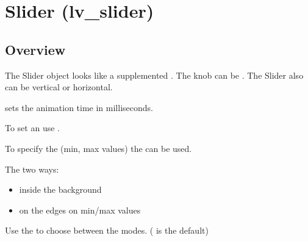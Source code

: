 \documentclass[letterpaper,10pt,english]{sphinxmanual}
\begin{document}
\section{Slider (lv\_slider)}
\label{\detokenize{object-types/slider:slider-lv-slider}}\label{\detokenize{object-types/slider::doc}}

\subsection{Overview}
\label{\detokenize{object-types/slider:overview}}
The Slider object looks like a {\hyperref[\detokenize{object-types/bar::doc}]{}} supplemented . The knob can be . The Slider also can be vertical or horizontal.

 sets the animation time in milliseconds.

To set an  use .

To specify the  (min, max values) the  can be used.

The  two ways:
\begin{itemize}
\item {} 
inside the background

\item {} 
on the edges on min/max values

\end{itemize}

Use the  to choose between the modes. ( is the default)
\end{document}
